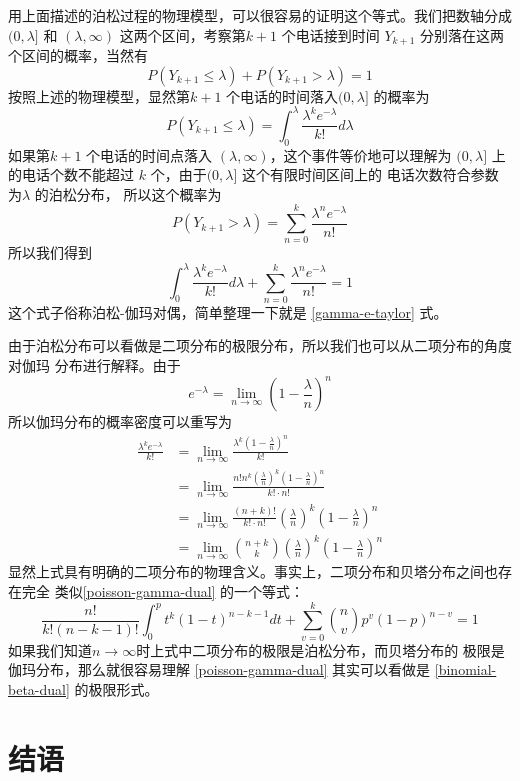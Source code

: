用上面描述的泊松过程的物理模型，可以很容易的证明这个等式。我们把数轴分成
$(0, \lambda]$ 和 $(\lambda, \infty)$ 这两个区间，考察第$k+1$ 个电话接到时间
$Y_{k+1}$ 分别落在这两个区间的概率，当然有
$$ P(Y_{k+1} \le \lambda) + P(Y_{k+1} > \lambda)  = 1 $$
按照上述的物理模型，显然第$k+1$ 个电话的时间落入$(0, \lambda]$ 的概率为
$$ P(Y_{k+1} \le \lambda) = \int_0^\lambda \frac{\lambda^k e^{-\lambda}}{k!}  d \lambda $$
如果第$k+1$ 个电话的时间点落入 $(\lambda, \infty)$，这个事件等价地可以理解为 $(0,
\lambda]$ 上的电话个数不能超过 $k$ 个，由于$(0, \lambda]$ 这个有限时间区间上的
电话次数符合参数为$\lambda$ 的泊松分布， 所以这个概率为
$$  P(Y_{k+1} > \lambda) = \sum_{n=0}^k \frac{\lambda^n e^{-\lambda} }{n!} $$
所以我们得到
\begin{equation}
\label{poisson-gamma-dual}
\int_0^\lambda \frac{\lambda^k e^{-\lambda}}{k!}d\lambda 
+ \sum_{n=0}^k \frac{\lambda^n e^{-\lambda}}{n!} = 1 
\end{equation}
这个式子俗称泊松-伽玛对偶，简单整理一下就是 \eqref{gamma-e-taylor} 式。

由于泊松分布可以看做是二项分布的极限分布，所以我们也可以从二项分布的角度对伽玛
分布进行解释。由于 
$$ e^{-\lambda} = \lim_{n\rightarrow \infty} (1- \frac{\lambda}{n}) ^n $$
所以伽玛分布的概率密度可以重写为
\begin{align*}
\frac{\lambda^k e^{-\lambda}}{k!} 
& = \lim_{n\rightarrow \infty} \frac{\lambda^k (1-\frac{\lambda}{n}) ^n}{k!}  \\
& = \lim_{n\rightarrow \infty} \frac{ n! n^k (\frac{\lambda}{n})^k (1-\frac{\lambda}{n}) ^n}{k! \cdot n!} \\
& = \lim_{n\rightarrow \infty} \frac{(n+k)!}{k!\cdot n!} (\frac{\lambda}{n})^k (1-\frac{\lambda}{n}) ^n  \\
& = \lim_{n\rightarrow \infty} \binom{n+k}{k} (\frac{\lambda}{n})^k (1-\frac{\lambda}{n}) ^n 
\end{align*}
显然上式具有明确的二项分布的物理含义。事实上，二项分布和贝塔分布之间也存在完全
类似\eqref{poisson-gamma-dual} 的一个等式：
\begin{equation}
\label{binomial-beta-dual}
\frac{n!}{k!(n-k-1)!} \int_0^p t^k(1-t)^{n-k-1} dt + \sum_{v=0}^k \binom{n}{v} p^v(1-p)^{n-v} = 1
\end{equation}
如果我们知道$n\rightarrow\infty$时上式中二项分布的极限是泊松分布，而贝塔分布的
极限是伽玛分布，那么就很容易理解 \eqref{poisson-gamma-dual} 其实可以看做是
\eqref{binomial-beta-dual} 的极限形式。 

\section{结语}

